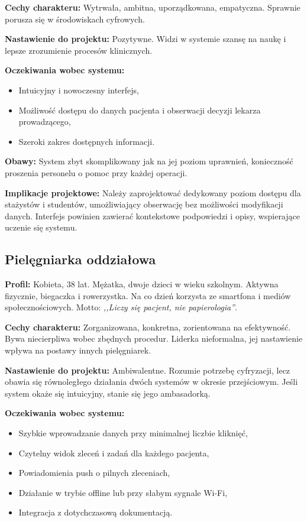 \textbf{Cechy charakteru:} Wytrwała, ambitna, uporządkowana, empatyczna. Sprawnie porusza się w środowiskach cyfrowych.

\textbf{Nastawienie do projektu:} Pozytywne. Widzi w systemie szansę na naukę i lepsze zrozumienie procesów klinicznych.

\textbf{Oczekiwania wobec systemu:}
\begin{itemize}
    \item Intuicyjny i nowoczesny interfejs,
    \item Możliwość dostępu do danych pacjenta i obserwacji decyzji lekarza prowadzącego,
    \item Szeroki zakres dostępnych informacji.
\end{itemize}

\textbf{Obawy:} System zbyt skomplikowany jak na jej poziom uprawnień, konieczność proszenia personelu o pomoc przy każdej operacji.

\textbf{Implikacje projektowe:} Należy zaprojektować dedykowany poziom dostępu dla stażystów i studentów, umożliwiający obserwację bez możliwości modyfikacji danych. Interfejs powinien zawierać kontekstowe podpowiedzi i opisy, wspierające uczenie się systemu.

\subsection{Pielęgniarka oddziałowa}

\textbf{Profil:} Kobieta, 38 lat. Mężatka, dwoje dzieci w wieku szkolnym. Aktywna fizycznie, biegaczka i rowerzystka. Na co dzień korzysta ze smartfona i mediów społecznościowych. Motto: \emph{,,Liczy się pacjent, nie papierologia''}.

\textbf{Cechy charakteru:} Zorganizowana, konkretna, zorientowana na efektywność. Bywa niecierpliwa wobec zbędnych procedur. Liderka nieformalna, jej nastawienie wpływa na postawy innych pielęgniarek.

\textbf{Nastawienie do projektu:} Ambiwalentne. Rozumie potrzebę cyfryzacji, lecz obawia się równoległego działania dwóch systemów w okresie przejściowym. Jeśli system okaże się intuicyjny, stanie się jego ambasadorką.

\textbf{Oczekiwania wobec systemu:}
\begin{itemize}
    \item Szybkie wprowadzanie danych przy minimalnej liczbie kliknięć,
    \item Czytelny widok zleceń i zadań dla każdego pacjenta,
    \item Powiadomienia push o pilnych zleceniach,
    \item Działanie w trybie offline lub przy słabym sygnale Wi-Fi,
    \item Integracja z dotychczasową dokumentacją.
\end{itemize}

